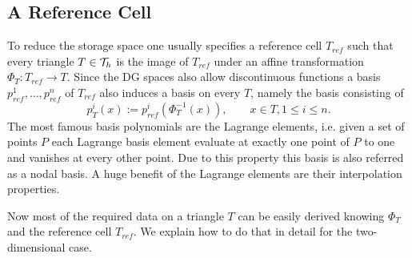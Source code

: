 \begin{definition} 
\subsection{A Reference Cell}
To reduce the storage space one usually specifies a reference cell $T_{ref}$ such that every triangle $T \in \mathcal{T}_h$ is the image of $T_{ref}$ under an affine transformation $\Phi_T:T_{ref} \rightarrow T$. 
Since the DG spaces also allow discontinuous functions a basis $p^1_{ref},\dots,p^n_{ref}$ of $T_{ref}$ also induces a basis on every $T$, namely the basis consisting of 
\[
	p_T^i(x) := p^i_{ref}(\Phi_T^{-1}(x)), \qquad x \in T, 1 \leq i \leq n.
\]
The most famous basis polynomials are the Lagrange elements, i.e. given a set of points $P$ each Lagrange basis element evaluate at exactly one point of $P$ to one and vanishes at every other point. Due to this property this basis is also referred as a nodal basis. 
A huge benefit of the Lagrange elements are their interpolation properties. 

Now most of the required data on a triangle $T$ can be easily derived knowing $\Phi_T$ and the reference cell $T_{ref}$. We explain how to do that in detail for the two-dimensional case.


\end{definition}
